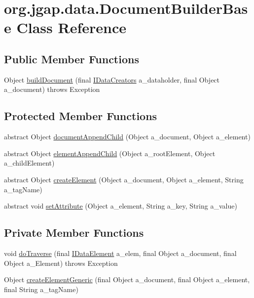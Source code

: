 \hypertarget{classorg_1_1jgap_1_1data_1_1_document_builder_base}{\section{org.\-jgap.\-data.\-Document\-Builder\-Base Class Reference}
\label{classorg_1_1jgap_1_1data_1_1_document_builder_base}
}
\subsection*{Public Member Functions}
\begin{DoxyCompactItemize}
\item 
Object \hyperlink{classorg_1_1jgap_1_1data_1_1_document_builder_base_a9c17627652f63e842a01b23640244164}{build\-Document} (final \hyperlink{interfaceorg_1_1jgap_1_1data_1_1_i_data_creators}{I\-Data\-Creators} a\-\_\-dataholder, final Object a\-\_\-document)  throws Exception 
\end{DoxyCompactItemize}
\subsection*{Protected Member Functions}
\begin{DoxyCompactItemize}
\item 
abstract Object \hyperlink{classorg_1_1jgap_1_1data_1_1_document_builder_base_a8e93e27975995198e29961ff13f8540c}{document\-Append\-Child} (Object a\-\_\-document, Object a\-\_\-element)
\item 
abstract Object \hyperlink{classorg_1_1jgap_1_1data_1_1_document_builder_base_a99c384f0c43ac1d35d6a5270f642bec9}{element\-Append\-Child} (Object a\-\_\-root\-Element, Object a\-\_\-child\-Element)
\item 
abstract Object \hyperlink{classorg_1_1jgap_1_1data_1_1_document_builder_base_a48956cd46c57c9385eb0ff415efb06ba}{create\-Element} (Object a\-\_\-document, Object a\-\_\-element, String a\-\_\-tag\-Name)
\item 
abstract void \hyperlink{classorg_1_1jgap_1_1data_1_1_document_builder_base_af3b9815c594048ebf431d69392432470}{set\-Attribute} (Object a\-\_\-element, String a\-\_\-key, String a\-\_\-value)
\end{DoxyCompactItemize}
\subsection*{Private Member Functions}
\begin{DoxyCompactItemize}
\item 
void \hyperlink{classorg_1_1jgap_1_1data_1_1_document_builder_base_af8fa5961d7a5d6531c085ffd4f9eb2bb}{do\-Traverse} (final \hyperlink{interfaceorg_1_1jgap_1_1data_1_1_i_data_element}{I\-Data\-Element} a\-\_\-elem, final Object a\-\_\-document, final Object a\-\_\-\-Element)  throws Exception 
\item 
Object \hyperlink{classorg_1_1jgap_1_1data_1_1_document_builder_base_a0e1ea86e20b5ac3273c051fb4c2a86bd}{create\-Element\-Generic} (final Object a\-\_\-document, final Object a\-\_\-element, final String a\-\_\-tag\-Name)
\end{DoxyCompactItemize}
